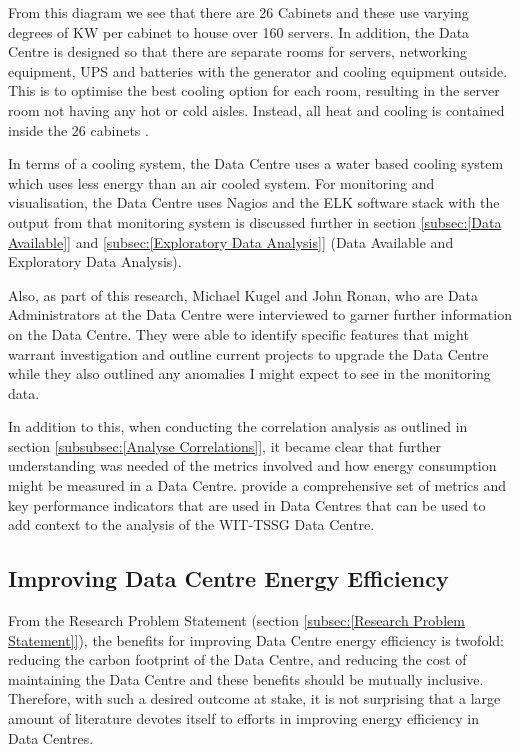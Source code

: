 \documentclass[12pt]{scrartcl}
\begin{document}
From this diagram we see that there are 26 Cabinets and these use varying degrees of KW per cabinet to house over 160 servers. In addition, the Data Centre is designed so that there are separate rooms for servers, networking equipment, UPS and batteries with the generator and cooling equipment outside. This is to optimise the best cooling option for each room, resulting in the server room not having any hot or cold aisles. Instead, all heat and cooling is contained inside the 26 cabinets \citep{TSSG}.

In terms of a cooling system, the Data Centre uses a water based cooling system which uses less energy than an air cooled system. For monitoring and visualisation, the Data Centre uses Nagios and the ELK software stack \citep{ELK} with the output from that monitoring system is discussed further in section \ref{subsec:[Data Available]} and \ref{subsec:[Exploratory Data Analysis]} (Data Available and Exploratory Data Analysis). 

Also, as part of this research, Michael Kugel and John Ronan, who are Data Administrators at the Data Centre were interviewed to garner further information on the Data Centre. They were able to identify specific features that might warrant investigation and outline current projects to upgrade the Data Centre while they also outlined any anomalies I might expect to see in the monitoring data.  

In addition to this, when conducting the correlation analysis as outlined in section \ref{subsubsec:[Analyse Correlations]}, it became clear that further understanding was needed of the metrics involved and how energy consumption might be measured in a Data Centre. \cite{edseee.792155120170101} provide a comprehensive set of metrics and key performance indicators that are used in Data Centres that can be used to add context to the analysis of the WIT-TSSG Data Centre. 


\subsection{Improving Data Centre Energy Efficiency}
\label{subsec:[Improving Data Centre Energy Efficiency]}

From the Research Problem Statement (section \ref{subsec:[Research Problem Statement]}), the benefits for improving Data Centre energy efficiency is twofold: reducing the carbon footprint of the Data Centre, and reducing the cost of maintaining the Data Centre and these benefits should be mutually inclusive. Therefore, with such a desired outcome at stake, it is not surprising that a large amount of literature devotes itself to efforts in improving energy efficiency in Data Centres.
\end{document}
